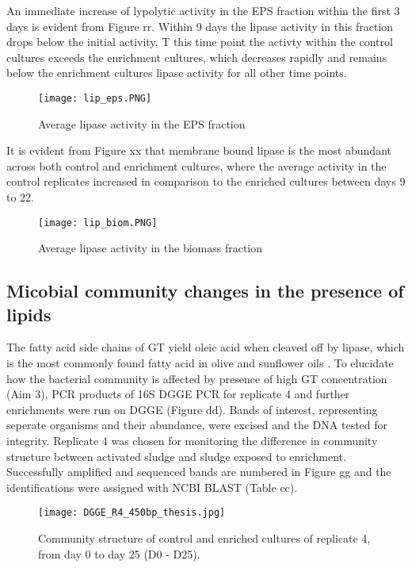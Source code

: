 \documentclass[11pt]{article}
\begin{document}
An immediate increase of lypolytic activity in the EPS  fraction within the first 3 days is evident from Figure rr. Within 9 days the lipase activity in this fraction drops below the initial activity. T this time point the activty within the control cultures exceeds the enrichment cultures, which decreases rapidly and remains below the enrichment cultures lipase activity for all other time points.

\begin{figure}
\texttt{[image: lip\_eps.PNG]}
\caption{Average lipase activity in the EPS fraction}
\end{figure}

It is evident from  Figure xx that membrane bound lipase is the most abundant across both control and enrichment cultures, where the average activity in the control replicates increased in comparison to the enriched cultures between days 9 to 22.

\begin{figure}
\texttt{[image: lip\_biom.PNG]}
\caption{Average lipase activity in the biomass fraction}
\end{figure}
\FloatBarrier



\subsection{Micobial community changes in the presence of lipids}
The fatty acid side chains of GT yield oleic acid when cleaved off by lipase, which is the most commonly found fatty acid in olive and sunflower oils \cite{haba2000isolation}. To elucidate how the bacterial community is affected by presence of high GT concentration (Aim 3), PCR products of 16S DGGE PCR for replicate 4 and further enrichments were run on DGGE (Figure dd). Bands of interest, representing seperate organisms and their abundance, were excised and the DNA tested for integrity. Replicate 4 was chosen for monitoring the difference in community structure between activated sludge and sludge exposed to enrichment. Successfully amplified and sequenced bands are numbered in Figure gg and the identifications were assigned with NCBI BLAST (Table cc). 

\begin{figure}
\texttt{[image: DGGE\_R4\_450bp\_thesis.jpg]}
\caption{Community structure of control and enriched cultures of replicate 4, from day 0 to day 25 (D0 - D25).}
\end{figure}
\end{document}
